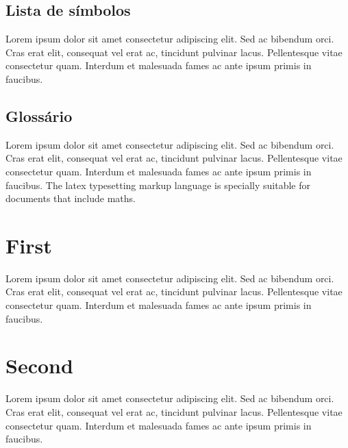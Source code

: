 \documentclass[11pt, a4paper]{report}
\begin{document}
\section*{Lista de símbolos}
\par Lorem ipsum dolor sit amet consectetur adipiscing elit. Sed ac bibendum orci. Cras erat elit, consequat vel erat ac, tincidunt pulvinar lacus. Pellentesque vitae consectetur quam. Interdum et malesuada fames ac ante ipsum primis in faucibus.
\clearpage

\linenumbers %





\clearpage

\section*{Glossário}
\par Lorem ipsum dolor sit amet consectetur adipiscing elit. Sed ac bibendum orci. Cras erat elit, consequat vel erat ac, tincidunt pulvinar lacus. Pellentesque vitae consectetur quam. Interdum et malesuada fames ac ante ipsum primis in faucibus.
The \Gls{latex} typesetting markup language is specially suitable 
for documents that include \gls{maths}. 

\clearpage

\printglossaries

\clearpage



\begin{appendices}

\chapter{First}
\par Lorem ipsum dolor sit amet consectetur adipiscing elit. Sed ac bibendum orci. Cras erat elit, consequat vel erat ac, tincidunt pulvinar lacus. Pellentesque vitae consectetur quam. Interdum et malesuada fames ac ante ipsum primis in faucibus.
\clearpage

\chapter{Second}
\par Lorem ipsum dolor sit amet consectetur adipiscing elit. Sed ac bibendum orci. Cras erat elit, consequat vel erat ac, tincidunt pulvinar lacus. Pellentesque vitae consectetur quam. Interdum et malesuada fames ac ante ipsum primis in faucibus.
\clearpage

\end{appendices}
\end{document}
